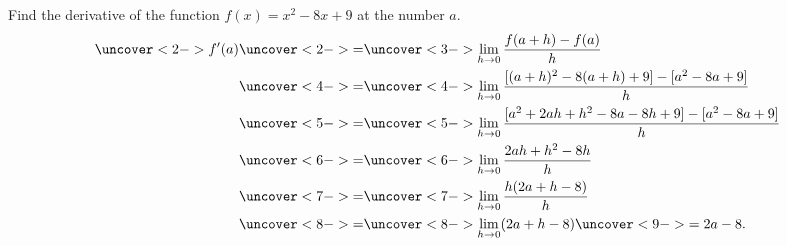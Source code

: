 \begin{frame}
\begin{example} %
Find the derivative of the function $f(x) = x^2 -8x + 9$ at the number $a$.
\abovedisplayskip=0pt
\belowdisplayskip=-15pt
\abovedisplayshortskip=0pt
\belowdisplayshortskip=0pt
\begin{align*}
\uncover<2->{f'(a)} & \uncover<2->{=}  %
\uncover<3->{\lim_{h\rightarrow 0}\frac{f(a+h)-f(a)}{h}}\\
 & \uncover<4->{=}  %
\uncover<4->{\lim_{h\rightarrow 0}\frac{[(a+h)^2-8(a+h)+9]-[a^2-8a+9]}{h}}\\
 & \uncover<5->{=}  %
\uncover<5->{\lim_{h\rightarrow 0}\frac{[a^2 + 2ah + h^2-8a-8h+9]-[a^2-8a+9]}{h}}\\
 & \uncover<6->{=}  %
\uncover<6->{\lim_{h\rightarrow 0}\frac{2ah + h^2-8h}{h}}\\
 & \uncover<7->{=}  %
\uncover<7->{\lim_{h\rightarrow 0}\frac{h(2a + h-8)}{h}}\\
 & \uncover<8->{=}  %
\uncover<8->{\lim_{h\rightarrow 0}(2a + h-8)} \uncover<9->{ = 2a-8.}
\end{align*}
\end{example}
\end{frame}
